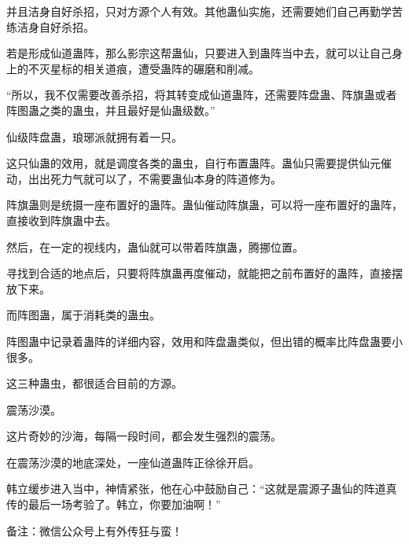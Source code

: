 \begin{this_body}
并且洁身自好杀招，只对方源个人有效。其他蛊仙实施，还需要她们自己再勤学苦练洁身自好杀招。

若是形成仙道蛊阵，那么影宗这帮蛊仙，只要进入到蛊阵当中去，就可以让自己身上的不灭星标的相关道痕，遭受蛊阵的碾磨和削减。

“所以，我不仅需要改善杀招，将其转变成仙道蛊阵，还需要阵盘蛊、阵旗蛊或者阵图蛊之类的蛊虫，并且最好是仙蛊级数。”

仙级阵盘蛊，琅琊派就拥有着一只。

这只仙蛊的效用，就是调度各类的蛊虫，自行布置蛊阵。蛊仙只需要提供仙元催动，出出死力气就可以了，不需要蛊仙本身的阵道修为。

阵旗蛊则是统摄一座布置好的蛊阵。蛊仙催动阵旗蛊，可以将一座布置好的蛊阵，直接收到阵旗蛊中去。

然后，在一定的视线内，蛊仙就可以带着阵旗蛊，腾挪位置。

寻找到合适的地点后，只要将阵旗蛊再度催动，就能把之前布置好的蛊阵，直接摆放下来。

而阵图蛊，属于消耗类的蛊虫。

阵图蛊中记录着蛊阵的详细内容，效用和阵盘蛊类似，但出错的概率比阵盘蛊要小很多。

这三种蛊虫，都很适合目前的方源。

震荡沙漠。

这片奇妙的沙海，每隔一段时间，都会发生强烈的震荡。

在震荡沙漠的地底深处，一座仙道蛊阵正徐徐开启。

韩立缓步进入当中，神情紧张，他在心中鼓励自己：“这就是震源子蛊仙的阵道真传的最后一场考验了。韩立，你要加油啊！”

备注：微信公众号上有外传狂与蛮！

\end{this_body}

